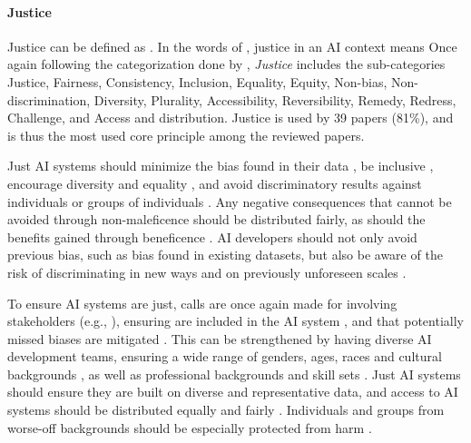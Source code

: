 \paragraph{Justice}
Justice can be defined as  \parencite{dictionary_justice}. In the words of \textcite[p.~7]{Floridi_2019}, justice in an AI context means  Once again following the categorization done by \textcite{Ryan_2021}, \textit{Justice} includes the sub-categories Justice, Fairness, Consistency, Inclusion, Equality, Equity, Non-bias, Non-discrimination, Diversity, Plurality, Accessibility, Reversibility, Remedy, Redress, Challenge, and Access and distribution. Justice is used by 39 papers (81\%), and is thus the most used core principle among the reviewed papers.

Just AI systems should minimize the bias found in their data \parencite{Rothenberger_2019,Nauck_2019,Jobin_2019,Fjeld_2020,Clarke_2019}, be inclusive \parencite{Mikalef_2022,Lu_2022}, encourage diversity \parencite{Mikalef_2022} and equality \parencite{Gupta_2021,Fjeld_2020,Canca_2020}, and avoid discriminatory results against individuals or groups of individuals \parencite{Mikalef_2022,Werder_2022,Lu_2022,Jobin_2019,Hacker_2022}. Any negative consequences that cannot be avoided through non-maleficence should be distributed fairly, as should the benefits gained through beneficence \parencite{Jobin_2019,Doorn_2021}. AI developers should not only avoid previous bias, such as bias found in existing datasets, but also be aware of the risk of discriminating in new ways and on previously unforeseen scales \parencite[p.~48]{Fjeld_2020}.

To ensure AI systems are just, calls are once again made for involving stakeholders (e.g., \cite{Lu_2022,Fjeld_2020}), ensuring  are included in the AI system \parencite[p.~10]{Lukkien_2021}, and that potentially missed biases are mitigated \parencite{Siala_2022}. This can be strengthened by having diverse AI development teams, ensuring a wide range of genders, ages, races and cultural backgrounds \parencite[p.~104]{Lu_2022}, as well as professional backgrounds and skill sets \parencite[p.~52]{Fjeld_2020}. Just AI systems should ensure they are built on diverse \parencite{Doorn_2021} and representative \parencite{Hacker_2022,Fjeld_2020} data, and access to AI systems should be distributed equally and fairly \parencite{Jobin_2019,Fjeld_2020,Canca_2020}. Individuals and groups from worse-off backgrounds should be especially protected from harm \parencite{Canca_2020}.

